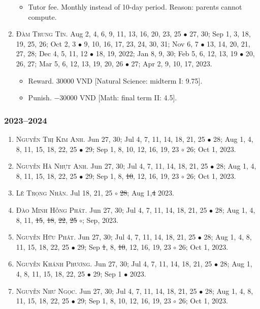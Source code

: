 \documentclass{article}
\begin{document}
\begin{enumerate}
	\begin{itemize}
		\item {\sf Tutor fee.} Monthly instead of 10-day period. Reason: parents cannot compute.
	\end{itemize}
	\item \textsc{Đàm Trung Tín.} {\sf[In]} Aug 2, 4, 6, 9, 11, 13, 16, 20, 23, 25 $\bullet$ 27, 30; Sep 1, 3, 18, 19, 25, 26; Oct 2, 3 $\bullet$ 9, 10, 16, 17, 23, 24, 30, 31; Nov 6, 7 $\bullet$ 13, 14, 20, 21, 27, 28; Dec 4, 5, 11, 12 $\bullet$ 18, 19, 2022; Jan 8, 9, 30; Feb 5, 6, 12, 13, 19 $\bullet$ 20, 26, 27; Mar 5, 6, 12, 13, 19, 20, 26 $\bullet$ 27; Apr 2, 9, 10, 17, 2023. {\sf[Out]}
	\begin{itemize}
		\item {\sf Reward.} 30000 VND [Natural Science: midterm I: 9.75].
		\item {\sf Punish.} $-30000$ VND [Math: final term II: 4.5].
	\end{itemize}
\end{enumerate}

\subsubsection{2023--2024}
 
\begin{enumerate}
	\item \textsc{Nguyễn Thị Kim Anh.} {\sf[In]} Jun 27, 30; Jul 4, 7, 11, 14, 18, 21, 25 $\bullet$ 28; Aug 1, 4, 8, 11, 15, 18, 22, 25 $\bullet$ 29; Sep 1, 8, 10, 12, 16, 19, 23 $\circ$ 26; Oct 1, 2023.
	\item \textsc{Nguyễn Hà Nhựt Anh.} {\sf[In]} Jun 27, 30; Jul 4, 7, 11, 14, 18, 21, 25 $\bullet$ 28; Aug 1, 4, 8, 11, 15, 18, 22, 25 $\bullet$ 29; Sep 1, 8, \st{10}, 12, 16, 19, 23 $\circ$ 26; Oct 1, 2023.
	\item \textsc{Lê Trọng Nhân.} {\sf[In]} Jul 18, 21, 25 $\circ$ \st{28}; Aug 1,\st{4} 2023. \sf{[Out]}
	\item \textsc{Đào Minh Hồng Phát.} {\sf[In]} Jun 27, 30; Jul 4, 7, 11, 14, 18, 21, 25 $\bullet$ 28; Aug 1, 4, 8, 11, \st{15}, \st{18}, \st{22}, \st{25} $\circ$; Sep, 2023. \sf{[Out]}
	\item \textsc{Nguyễn Hữu Phát.} {\sf[In]} Jun 27, 30; Jul 4, 7, 11, 14, 18, 21, 25 $\bullet$ 28; Aug 1, 4, 8, 11, 15, 18, 22, 25 $\bullet$ 29; Sep \st{1}, 8, \st{10}, 12, 16, 19, 23 $\circ$ 26; Oct 1, 2023.
	\item \textsc{Nguyễn Khánh Phương.} {\sf[In]} Jun 27, 30; Jul 4, 7, 11, 14, 18, 21, 25 $\bullet$ 28; Aug 1, 4, 8, 11, 15, 18, 22, 25 $\bullet$ 29; Sep 1 $\bullet$ 2023. \sf{[Out]}
	\item \textsc{Nguyễn Như Ngọc.} {\sf[In]} Jun 27, 30; Jul 4, 7, 11, 14, 18, 21, 25 $\bullet$ 28; Aug 1, 4, 8, 11, 15, 18, 22, 25 $\bullet$ 29; Sep 1, 8, 10, 12, 16, 19, 23 $\circ$ 26; Oct 1, 2023.
\end{enumerate}
\end{document}
